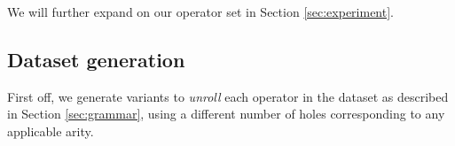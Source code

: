 \documentclass{article}
\begin{document}

We will further expand on our operator set
in Section \ref{sec:experiment}.

\subsection{Dataset generation} \label{sec:datagen}




First off, we generate variants to \emph{unroll} each operator in the dataset
as described in Section \ref{sec:grammar},
using a different number of holes corresponding to any applicable arity.
\end{document}
